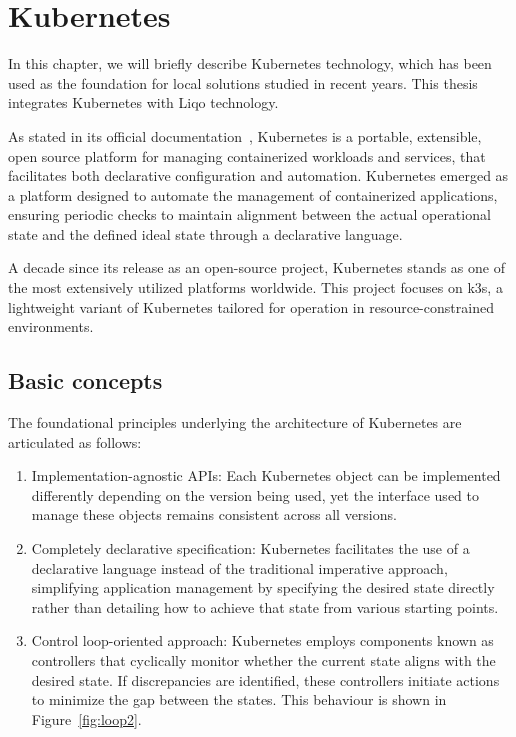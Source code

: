 \chapter{Kubernetes}
In this chapter, we will briefly describe Kubernetes technology, which has been used as the foundation for local solutions studied in recent years. This thesis integrates Kubernetes with Liqo technology.

As stated in its official documentation~\cite{k0-1}, Kubernetes is a portable, extensible, open source platform for managing containerized workloads and services, that facilitates both declarative configuration and automation. Kubernetes emerged as a platform designed to automate the management of containerized applications, ensuring periodic checks to maintain alignment between the actual operational state and the defined ideal state through a declarative language. 

A decade since its release as an open-source project, Kubernetes stands as one of the most extensively utilized platforms worldwide. This project focuses on k3s, a lightweight variant of Kubernetes tailored for operation in resource-constrained environments.

\section{Basic concepts}
The foundational principles underlying the architecture of Kubernetes are articulated as follows:
\begin{enumerate}
\item Implementation-agnostic APIs: Each Kubernetes object can be implemented differently depending on the version being used, yet the interface used to manage these objects remains consistent across all versions.
\item Completely declarative specification: Kubernetes facilitates the use of a declarative language instead of the traditional imperative approach, simplifying application management by specifying the desired state directly rather than detailing how to achieve that state from various starting points.
\item Control loop-oriented approach: Kubernetes employs components known as controllers that cyclically monitor whether the current state aligns with the desired state. If discrepancies are identified, these controllers initiate actions to minimize the gap between the states. This behaviour is shown in Figure~\ref{fig:loop2}.
\end{enumerate}

